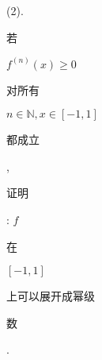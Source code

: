 \documentclass[10pt]{article}
\begin{document}
(2). \begin{CJK}{UTF8}{mj}若\end{CJK} $f^{(n)}(x) \geq 0$ \begin{CJK}{UTF8}{mj}对所有\end{CJK} $n \in \mathbb{N}, x \in[-1,1]$ \begin{CJK}{UTF8}{mj}都成立\end{CJK}, \begin{CJK}{UTF8}{mj}证明\end{CJK}: $f$ \begin{CJK}{UTF8}{mj}在\end{CJK} $[-1,1]$ \begin{CJK}{UTF8}{mj}上可以展开成幂级\end{CJK} \begin{CJK}{UTF8}{mj}数\end{CJK}.
\end{document}

